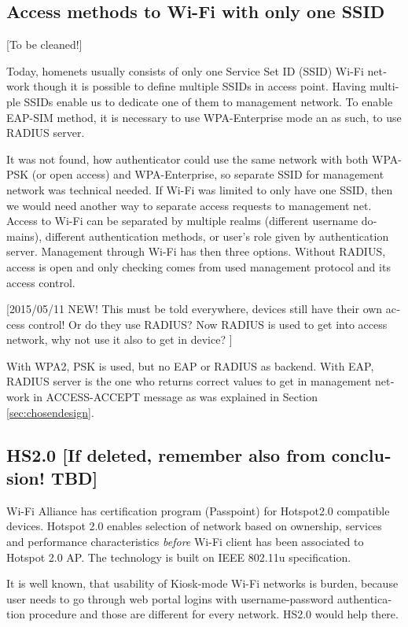 \documentclass[12pt,a4paper,english]{tutthesis}
\begin{document}
\begin{otherlanguage}{english}
\section{Access methods to Wi-Fi with only one SSID}
\label{sec-4-4}

[To be cleaned!]

Today, homenets usually consists of only one Service Set ID (SSID)
Wi-Fi network though it is possible to define multiple SSIDs in
access point. Having multiple SSIDs enable us to dedicate one of them
to management network. 
To enable EAP-SIM method, it is necessary to use WPA-Enterprise mode
an as such, to use RADIUS server.

It was not found, how authenticator could use the same network with
both WPA-PSK (or open access) and WPA-Enterprise, so
separate SSID for management network was technical needed.
If Wi-Fi was limited to only have one SSID, then we would need another
way to separate access requests to management net.  Access to Wi-Fi
can be separated by multiple realms (different username domains),
different authentication methods, or user's role
given by authentication server. Management through Wi-Fi has then three
options.  Without RADIUS, access is open and only checking comes from
used management protocol and its access control.

[2015/05/11 NEW! This must be told everywhere, devices still have their own access
control! Or do they use RADIUS? Now RADIUS is used to get into access
network, why not use it also to get in device? ]

With WPA2, PSK is used, but no EAP or RADIUS as backend.  With EAP,
RADIUS server is the one who returns correct values to get in
management network in ACCESS-ACCEPT message as was
explained in Section \ref{sec:chosendesign}.


\subsection{HS2.0 [If deleted, remember also from conclusion! TBD]}
\label{sec-4-4-1}

Wi-Fi Alliance has certification program (Passpoint) for Hotspot2.0 compatible
devices.  Hotspot 2.0 enables selection of network based on ownership,
services and performance characteristics \emph{before} Wi-Fi client has
been associated to Hotspot 2.0 AP. The technology is built on
IEEE 802.11u specification.




It is well known, that usability of Kiosk-mode Wi-Fi
 networks is burden, because user needs to go through 
web portal logins with username-password authentication 
procedure and those are different for every network.
HS2.0 would help there.


\end{otherlanguage}
\end{document}
